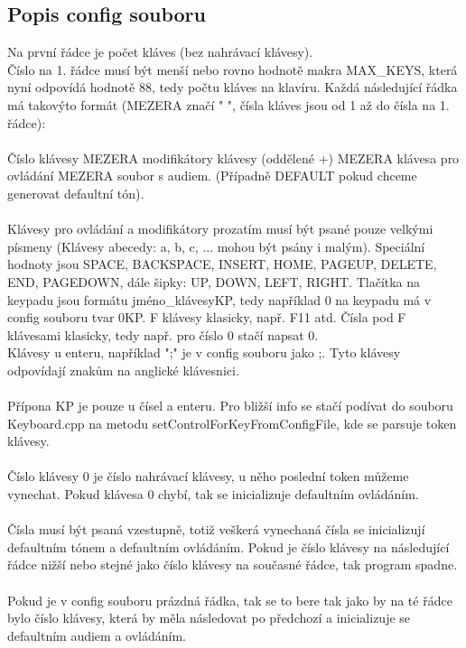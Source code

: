 \documentclass[12pt]{article}
\begin{document}
	\subsection{Popis config souboru}
	Na první řádce je počet kláves (bez nahrávací klávesy).
	\\
	Číslo na 1. řádce musí být menší nebo rovno hodnotě makra MAX\_KEYS, která nyní odpovídá hodnotě 88, tedy počtu kláves na klavíru. 
	Každá následující řádka má takovýto formát (MEZERA značí " ", čísla kláves jsou od 1 až do čísla na 1. řádce):
	\\
	\\
	Číslo klávesy MEZERA modifikátory klávesy (oddělené +) MEZERA klávesa pro ovládání MEZERA soubor s audiem. (Případně DEFAULT pokud chceme generovat defaultní tón).
	\\
	\\
	Klávesy pro ovládání a modifikátory prozatím musí být psané pouze velkými písmeny (Klávesy abecedy: a, b, c, ... mohou být psány i malým). Speciální hodnoty jsou SPACE, BACKSPACE, INSERT, HOME, PAGEUP, DELETE, END, PAGEDOWN, dále šipky: UP, DOWN, LEFT, RIGHT. Tlačítka na keypadu jsou formátu jméno\_klávesyKP, tedy například 0 na keypadu má v config souboru tvar 0KP. F klávesy klasicky, např. F11 atd. Čísla pod F klávesami klasicky, tedy např. pro číslo 0 stačí napsat 0.
	\\
	Klávesy u enteru, například ";" je v config souboru jako ;. Tyto klávesy odpovídají znakům na anglické klávesnici. 
	\\
	\\
	Přípona KP je pouze u čísel a enteru. Pro bližší info se stačí podívat do souboru Keyboard.cpp na metodu setControlForKeyFromConfigFile, kde se parsuje token klávesy.	 
	\\
	\\
	Číslo klávesy 0 je číslo nahrávací klávesy, u něho poslední token můžeme vynechat. Pokud klávesa 0 chybí, tak se inicializuje defaultním ovládáním.
	\\
	\\
	Čísla musí být psaná vzestupně, totiž veškerá vynechaná čísla se inicializují defaultním tónem a defaultním ovládáním.
	Pokud je číslo klávesy na následující řádce nižší nebo stejné jako číslo klávesy na současné řádce, tak program spadne.
	\\
	\\
	Pokud je v config souboru prázdná řádka, tak se to bere tak jako by na té řádce bylo číslo klávesy, která by měla následovat po předchozí a inicializuje se defaultním audiem a ovládáním.
\end{document}
